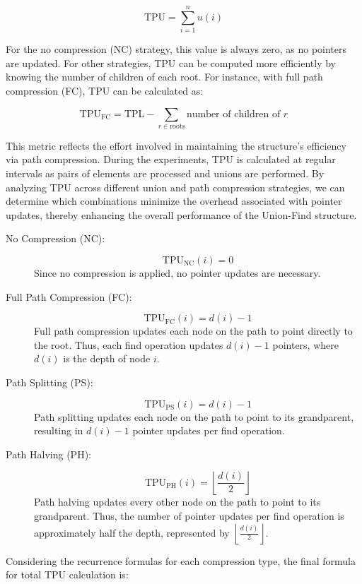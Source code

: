 \documentclass[10pt,a4paper,hidelinks]{article}
\begin{document}
$$\text{TPU} = \sum_{i=1}^{n} u(i)$$

For the no compression (NC) strategy, this value is always zero, as no pointers are updated. For other strategies, TPU can be computed more efficiently by knowing the number of children of each root. For instance, with full path compression (FC), TPU can be calculated as:

$$\text{TPU}_{\text{FC}} = \text{TPL} - \sum_{r \in \text{roots}} \text{number of children of } r$$

This metric reflects the effort involved in maintaining the structure's efficiency via path compression. During the experiments, TPU is calculated at regular intervals as pairs of elements are processed and unions are performed. By analyzing TPU across different union and path compression strategies, we can determine which combinations minimize the overhead associated with pointer updates, thereby enhancing the overall performance of the Union-Find structure.


\begin{description}
    \item[No Compression (NC):]
      \[
      \text{TPU}_{\text{NC}}(i) = 0
      \]
      Since no compression is applied, no pointer updates are necessary.
    
    \item[Full Path Compression (FC):]
      \[
      \text{TPU}_{\text{FC}}(i) = d(i) - 1
      \]
      Full path compression updates each node on the path to point directly to the root. Thus, each find operation updates $d(i) - 1$ pointers, where $d(i)$ is the depth of node $i$.
    
    \item[Path Splitting (PS):]
      \[
      \text{TPU}_{\text{PS}}(i) = d(i) - 1
      \]
      Path splitting updates each node on the path to point to its grandparent, resulting in $d(i) - 1$ pointer updates per find operation.
    
    \item[Path Halving (PH):]
      \[
      \text{TPU}_{\text{PH}}(i) = \left\lfloor \frac{d(i)}{2} \right\rfloor
      \]
      Path halving updates every other node on the path to point to its grandparent. Thus, the number of pointer updates per find operation is approximately half the depth, represented by $\left\lfloor \frac{d(i)}{2} \right\rfloor$.
\end{description}

Considering the recurrence formulas for each compression type, the final formula for total TPU calculation is:
\end{document}

